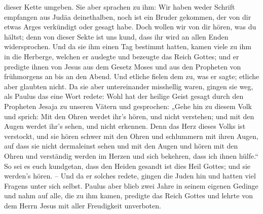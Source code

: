 dieser Kette umgeben.  Sie aber sprachen zu ihm: Wir haben
weder Schrift empfangen aus Judäa deinethalben, noch ist ein Bruder
gekommen, der von dir etwas Arges verkündigt oder gesagt habe.
 Doch wollen wir von dir hören, was du hältst; denn von
dieser Sekte ist uns kund, dass ihr wird an allen Enden widersprochen.
 Und da sie ihm einen Tag bestimmt hatten, kamen viele zu
ihm in die Herberge, welchen er auslegte und bezeugte das Reich Gottes;
und er predigte ihnen von Jesus aus dem Gesetz Moses und aus den
Propheten von frühmorgens an bis an den Abend.  Und etliche
fielen dem zu, was er sagte; etliche aber glaubten nicht. 
Da sie aber untereinander misshellig waren, gingen sie weg, als Paulus
das eine Wort redete: Wohl hat der heilige Geist gesagt durch den
Propheten Jesaja zu unseren Vätern  und gesprochen: „Gehe
hin zu diesem Volk und sprich: Mit den Ohren werdet ihr's hören, und
nicht verstehen; und mit den Augen werdet ihr's sehen, und nicht
erkennen.  Denn das Herz dieses Volks ist verstockt, und
sie hören schwer mit den Ohren und schlummern mit ihren Augen, auf dass
sie nicht dermaleinst sehen und mit den Augen und hören mit den Ohren
und verständig werden im Herzen und sich bekehren, dass ich ihnen
hülfe.``  So sei es euch kundgetan, dass den Heiden gesandt
ist dies Heil Gottes; und sie werden's hören. --  Und da er
solches redete, gingen die Juden hin und hatten viel Fragens unter sich
selbst.  Paulus aber blieb zwei Jahre in seinem eigenen
Gedinge und nahm auf alle, die zu ihm kamen,  predigte das
Reich Gottes und lehrte von dem Herrn Jesus mit aller Freudigkeit
unverboten.
